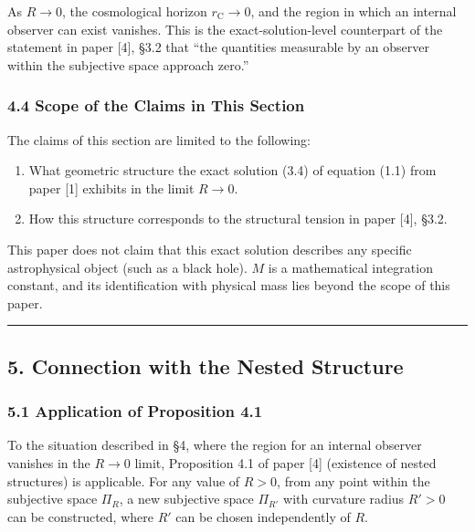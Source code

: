 \documentclass[a4paper,11pt]{article}
\theoremstyle{definition}
\providecommand{\tightlist}{\setlength{\itemsep}{0pt}\setlength{\parskip}{0pt}}
\begin{document}
As \(R \to 0\), the cosmological horizon \(r_{\mathrm{C}} \to 0\), and
the region in which an internal observer can exist vanishes. This is the
exact-solution-level counterpart of the statement in paper {[}4{]}, §3.2
that ``the quantities measurable by an observer within the subjective
space approach zero.''

\subsubsection{4.4 Scope of the Claims in This
Section}\label{scope-of-the-claims-in-this-section}

The claims of this section are limited to the following:

\begin{enumerate}
\def\labelenumi{\arabic{enumi}.}
\tightlist
\item
  What geometric structure the exact solution (3.4) of equation (1.1)
  from paper {[}1{]} exhibits in the limit \(R \to 0\).
\item
  How this structure corresponds to the structural tension in paper
  {[}4{]}, §3.2.
\end{enumerate}

This paper does not claim that this exact solution describes any
specific astrophysical object (such as a black hole). \(M\) is a
mathematical integration constant, and its identification with physical
mass lies beyond the scope of this paper.

\begin{center}\rule{0.5\linewidth}{0.5pt}\end{center}

\subsection{5. Connection with the Nested
Structure}\label{connection-with-the-nested-structure}

\subsubsection{5.1 Application of Proposition
4.1}\label{application-of-proposition-4.1}

To the situation described in §4, where the region for an internal
observer vanishes in the \(R \to 0\) limit, Proposition 4.1 of paper
{[}4{]} (existence of nested structures) is applicable. For any value of
\(R > 0\), from any point within the subjective space \(\Pi_R\), a new
subjective space \(\Pi_{R'}\) with curvature radius \(R' > 0\) can be
constructed, where \(R'\) can be chosen independently of \(R\).
\end{document}
